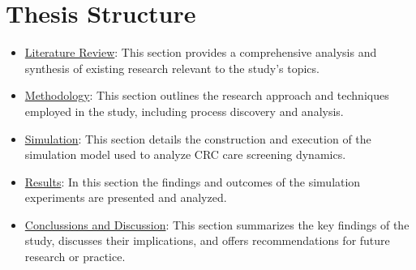 \section{Thesis Structure}

\begin{itemize}

    \item {\hyperref[chapter:literature_review]{Literature Review}: This section provides a comprehensive analysis and synthesis of existing research relevant to the study's topics.}

    \item {\hyperref[chapter:methodology]{Methodology}: This section outlines the research approach and techniques employed in the study, including process discovery and analysis.}

    \item {\hyperref[chapter:simulation]{Simulation}: This section details the construction and execution of the simulation model used to analyze CRC care screening dynamics.}

    \item {\hyperref[chapter:results]{Results}: In this section the findings and outcomes of the simulation experiments are presented and analyzed.}

    \item {\hyperref[chapter:conclusions]{Conclussions and Discussion}: This section summarizes the key findings of the study, discusses their implications, and offers recommendations for future research or practice.}

\end{itemize}
